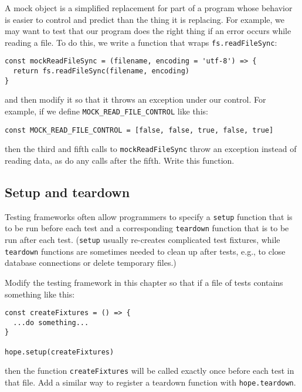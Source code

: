 \documentclass[krantzl]{krantz}
\begin{document}
A mock object is a simplified replacement for part of a program
whose behavior is easier to control and predict than the thing it is replacing.
For example,
we may want to test that our program does the right thing if an error occurs while reading a file.
To do this,
we write a function that wraps \texttt{fs.readFileSync}:

\begin{lstlisting}[frame=single,frameround=tttt]
const mockReadFileSync = (filename, encoding = 'utf-8') => {
  return fs.readFileSync(filename, encoding)
}
\end{lstlisting}


\noindent and then modify it so that it throws an exception under our control.
For example,
if we define \texttt{MOCK\_READ\_FILE\_CONTROL} like this:

\begin{lstlisting}[frame=single,frameround=tttt]
const MOCK_READ_FILE_CONTROL = [false, false, true, false, true]
\end{lstlisting}


\noindent then the third and fifth calls to \texttt{mockReadFileSync} throw an exception instead of reading data,
as do any calls after the fifth.
Write this function.

\subsection*{Setup and teardown}


Testing frameworks often allow programmers to specify a \texttt{setup} function
that is to be run before each test
and a corresponding \texttt{teardown} function
that is to be run after each test.
(\texttt{setup} usually re-creates complicated test fixtures,
while \texttt{teardown} functions are sometimes needed to clean up after tests,
e.g., to close database connections or delete temporary files.)


Modify the testing framework in this chapter so that
if a file of tests contains something like this:

\begin{lstlisting}[frame=single,frameround=tttt]
const createFixtures = () => {
  ...do something...
}

hope.setup(createFixtures)
\end{lstlisting}


\noindent then the function \texttt{createFixtures} will be called
exactly once before each test in that file.
Add a similar way to register a teardown function with \texttt{hope.teardown}.
\end{document}
